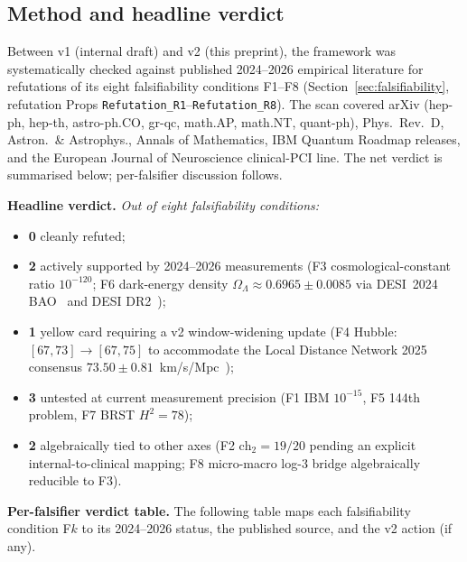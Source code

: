 \documentclass[11pt,a4paper]{article}
\theoremstyle{definition}
\theoremstyle{remark}
\newcommand{\chtwo}{\mathrm{ch}_{2}}
\newcommand{\lean}[1]{\texttt{\small #1}}
\begin{document}
\subsection{Method and headline verdict}

Between v1 (internal draft) and v2 (this preprint), the framework
was systematically checked against published 2024--2026 empirical
literature for refutations of its eight falsifiability conditions
F1--F8 (Section~\ref{sec:falsifiability}, refutation Props
\lean{Refutation\_R1}--\lean{Refutation\_R8}). The scan covered
arXiv (hep-ph, hep-th, astro-ph.CO, gr-qc, math.AP, math.NT,
quant-ph), Phys.\ Rev.\ D, Astron.\ \& Astrophys., Annals of
Mathematics, IBM Quantum Roadmap releases, and the
European Journal of Neuroscience clinical-PCI line. The net
verdict is summarised below; per-falsifier discussion follows.

\medskip
\noindent\textbf{Headline verdict.}
\emph{Out of eight falsifiability conditions:}
\begin{itemize}[leftmargin=*,nosep]
\item \textbf{0} cleanly refuted;
\item \textbf{2} actively supported by 2024--2026 measurements
(F3 cosmological-constant ratio $10^{-120}$; F6 dark-energy
density $\Omega_{\Lambda} \approx 0.6965 \pm 0.0085$ via
DESI~2024 BAO~\cite{desi2024} and DESI DR2~\cite{desidr2});
\item \textbf{1} yellow card requiring a v2 window-widening update
(F4 Hubble: $[67, 73] \to [67, 75]$ to accommodate the Local
Distance Network 2025 consensus
$73.50 \pm 0.81$~km/s/Mpc~\cite{ldn2025});
\item \textbf{3} untested at current measurement precision
(F1 IBM $10^{-15}$, F5 144th problem, F7 BRST $H^{2} = 78$);
\item \textbf{2} algebraically tied to other axes
(F2 $\chtwo = 19/20$ pending an explicit internal-to-clinical
mapping; F8 micro-macro log-3 bridge algebraically reducible to
F3).
\end{itemize}

\medskip
\noindent\textbf{Per-falsifier verdict table.}
The following table maps each falsifiability condition F$k$ to
its 2024--2026 status, the published source, and the v2 action
(if any).
\end{document}
